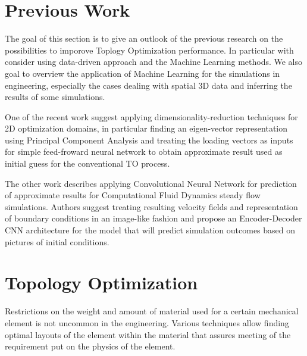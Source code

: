 \section{Previous Work}

The goal of this section is to give an outlook of the previous research on the possibilities to imporove Toplogy Optimization performance.
In particular with consider using data-driven approach and the Machine Learning methods.
We also goal to overview the application of Machine Learning for the simulations in engineering, especially the cases dealing with spatial 3D data and inferring the results of some simulations.
\medskip

One of the recent work \cite{bibl:prevwork_pca} suggest applying dimensionality-reduction techniques for 2D optimization domains, in particular finding an eigen-vector representation using Principal Component Analysis\cite{} and treating the loading vectors as inputs for simple feed-froward neural network to obtain approximate result used as initial guess for the conventional TO process.
\medskip

The other work \cite{prev:prevwork_cnncfd} describes applying Convolutional Neural Network for prediction of approximate results for Computational Fluid Dynamics steady flow simulations. 
Authors suggest treating resulting velocity fields and representation of boundary conditions in an image-like fashion and propose an Encoder-Decoder CNN architecture for the model that will predict simulation outcomes based on pictures of initial conditions.

\section{Topology Optimization}

Restrictions on the weight and amount of material used for a certain mechanical element is not uncommon in the engineering.
Various techniques allow finding optimal layouts of the element within the material that assures meeting of the requirement put on the physics of the element. 
\medskip

